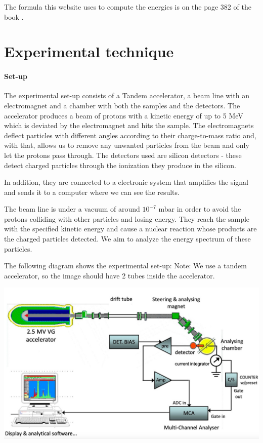 \documentclass{article}
\begin{document}
\begin{multicols}{2}
The formula this website uses to compute the energies is on the page 382 of the book \cite{krane1988}.

\section{Experimental technique}

\paragraph{Set-up}

The experimental set-up consists of a Tandem accelerator, a beam line with an electromagnet and a chamber with both the samples and the detectors.
The accelerator produces a beam of protons with a kinetic energy of up to 5 MeV which is deviated by the electromagnet and hits the sample. 
The electromagnets deflect particles with different angles according to their charge-to-mass ratio and, with that, allows us to remove any unwanted particles from the beam and only let the protons pass through.
The detectors used are silicon detectors - these detect charged particles through the ionization they produce in the silicon.

In addition, they are connected to a electronic system that amplifies the signal and sends it to a computer where we
can see the results.

The beam line is under a vacuum of around $10^{-7}$ mbar in order to avoid the protons colliding with other particles and losing energy. 
They reach the sample with the specified kinetic energy and cause a nuclear reaction whose products are the charged particles detected.
We aim to analyze the energy spectrum of these particles.

The following diagram shows the experimental set-up:
Note: We use a tandem accelerator, so the image should have 2 tubes inside the accelerator.

\begin{center}
  \includegraphics[width=0.95\linewidth]{../images/scheme.jpeg}
  \label{setup}
\end{center}


\end{multicols}
\end{document}

